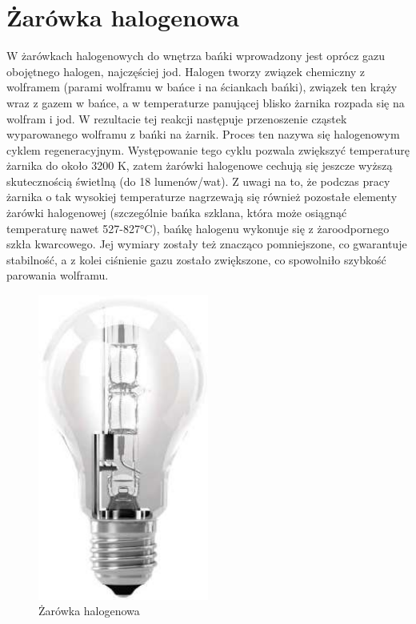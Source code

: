 \documentclass[12pt,a4paper]{book}
\begin{document}
\section*{Żarówka halogenowa}

W żarówkach halogenowych do wnętrza bańki wprowadzony jest oprócz gazu obojętnego halogen, najczęściej jod. Halogen tworzy związek chemiczny z wolframem (parami wolframu w bańce i na ściankach bańki), związek ten krąży wraz z gazem w bańce, a w temperaturze panującej blisko żarnika rozpada się na wolfram i jod. W rezultacie tej reakcji następuje przenoszenie cząstek wyparowanego wolframu z bańki na żarnik. Proces ten nazywa się halogenowym cyklem regeneracyjnym. Występowanie tego cyklu pozwala zwiększyć temperaturę żarnika do około 3200 K, zatem żarówki halogenowe cechują się jeszcze wyższą skutecznością świetlną (do 18 lumenów/wat). Z uwagi na to, że podczas pracy żarnika o tak wysokiej temperaturze nagrzewają się również pozostałe elementy żarówki halogenowej (szczególnie bańka szklana, która może osiągnąć temperaturę nawet 527-827°C), bańkę halogenu wykonuje się z żaroodpornego szkła kwarcowego. Jej wymiary zostały też znacząco pomniejszone, co gwarantuje stabilność, a z kolei ciśnienie gazu zostało zwiększone, co spowolniło szybkość parowania wolframu.

\begin{figure}[ht]
  \centering
  \includegraphics[width=0.5\textwidth]{Rysunek2.jpg}
  \caption{Żarówka halogenowa}
  \label{Rys.1.2.}
\end{figure}
\end{document}
